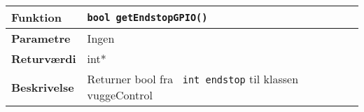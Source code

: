 \begin{center}
    \begin{tabular}{ | l | p{} |}
    \hline
    \textbf{Funktion}	& \verb+bool getEndstopGPIO() +				\\ \hline
    \textbf{Parametre} 	& Ingen							 		\\ \hline
    \textbf{Returværdi}	& int*									\\ \hline
    \textbf{Beskrivelse}	& Returner bool fra \verb+ int endstop+ til klassen vuggeControl	\\ \hline
    \end{tabular}
\end{center}
\newpage